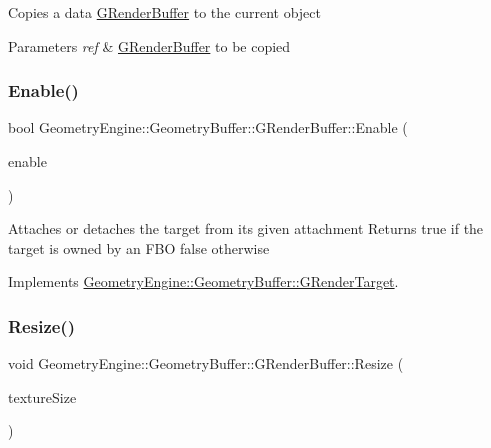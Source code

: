 Copies a data \mbox{\hyperlink{class_geometry_engine_1_1_geometry_buffer_1_1_g_render_buffer}{G\+Render\+Buffer}} to the current object 
\begin{DoxyParams}{Parameters}
{\em ref} & \mbox{\hyperlink{class_geometry_engine_1_1_geometry_buffer_1_1_g_render_buffer}{G\+Render\+Buffer}} to be copied \\
\hline
\end{DoxyParams}
\mbox{\label{class_geometry_engine_1_1_geometry_buffer_1_1_g_render_buffer_afb80727ba33997fb7f48551de1831111}} 
\subsubsection{\texorpdfstring{Enable()}{Enable()}}
{\footnotesize\ttfamily bool Geometry\+Engine\+::\+Geometry\+Buffer\+::\+G\+Render\+Buffer\+::\+Enable (\begin{DoxyParamCaption}\item[{bool}]{enable }\end{DoxyParamCaption})\hspace{0.3cm}{\ttfamily [virtual]}}

Attaches or detaches the target from its given attachment Returns true if the target is owned by an F\+BO false otherwise 

Implements \mbox{\hyperlink{class_geometry_engine_1_1_geometry_buffer_1_1_g_render_target_a1b8be750dfd13582d0730bf9e4c4e1d2}{Geometry\+Engine\+::\+Geometry\+Buffer\+::\+G\+Render\+Target}}.

\mbox{\label{class_geometry_engine_1_1_geometry_buffer_1_1_g_render_buffer_a3a3e0b2e031cce1c0bea9c2a4bc5465a}} 
\subsubsection{\texorpdfstring{Resize()}{Resize()}}
{\footnotesize\ttfamily void Geometry\+Engine\+::\+Geometry\+Buffer\+::\+G\+Render\+Buffer\+::\+Resize (\begin{DoxyParamCaption}\item[{const Q\+Vector2D \&}]{texture\+Size }\end{DoxyParamCaption})\hspace{0.3cm}{\ttfamily [virtual]}}

